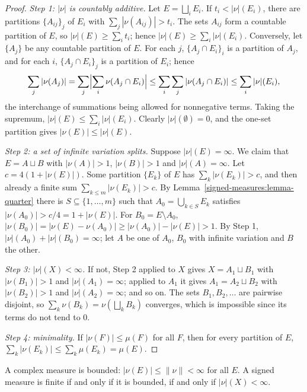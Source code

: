 \begin{proof}
\emph{Step 1: $|\nu|$ is countably additive.} Let $E = \bigsqcup_iE_i$. If $t_i < |\nu|(E_i)$, there are partitions $\{A_{ij}\}_j$ of $E_i$ with $\sum_j|\nu(A_{ij})| > t_i$. The sets $A_{ij}$ form a countable
partition of $E$, so $|\nu|(E) \geq \sum_it_i$; hence $|\nu|(E) \geq \sum_i|\nu|(E_i)$. Conversely, let $\{A_j\}$ be any countable partition of $E$. For each $j$, $\{A_j \cap E_i\}_i$ is a partition of
$A_j$, and for each $i$, $\{A_j \cap E_i\}_j$ is a partition of $E_i$; hence
\[
\sum_j|\nu(A_j)| = \sum_j\Bigl|\sum_i\nu(A_j \cap E_i)\Bigr| \leq \sum_i\sum_j|\nu(A_j \cap E_i)| \leq \sum_i|\nu|(E_i),
\]
the interchange of summations being allowed for nonnegative terms. Taking the supremum, $|\nu|(E) \leq \sum_i|\nu|(E_i)$. Clearly $|\nu|(\emptyset) = 0$, and the one-set partition gives
$|\nu(E)| \leq |\nu|(E)$.

\emph{Step 2: a set of infinite variation splits.} Suppose $|\nu|(E) = \infty$. We claim that $E = A \sqcup B$ with $|\nu(A)| > 1$, $|\nu(B)| > 1$ and $|\nu|(A) = \infty$. Let
$c = 4(1 + |\nu(E)|)$. Some partition $\{E_k\}$ of $E$ has $\sum_k|\nu(E_k)| > c$, and then already a finite sum $\sum_{k \leq m}|\nu(E_k)| > c$. By Lemma~\ref{signed-measures:lemma-quarter} there is
$S \subseteq \{1, \ldots, m\}$ such that $A_0 = \bigcup_{k \in S}E_k$ satisfies $|\nu(A_0)| > c/4 = 1 + |\nu(E)|$. For $B_0 = E \setminus A_0$,
$|\nu(B_0)| = |\nu(E) - \nu(A_0)| \geq |\nu(A_0)| - |\nu(E)| > 1$. By Step 1, $|\nu|(A_0) + |\nu|(B_0) = \infty$; let $A$ be one of $A_0$, $B_0$ with infinite variation and $B$ the other.

\emph{Step 3: $|\nu|(X) < \infty$.} If not, Step 2 applied to $X$ gives $X = A_1 \sqcup B_1$ with $|\nu(B_1)| > 1$ and $|\nu|(A_1) = \infty$; applied to $A_1$ it gives $A_1 = A_2 \sqcup B_2$ with
$|\nu(B_2)| > 1$ and $|\nu|(A_2) = \infty$; and so on. The sets $B_1, B_2, \ldots$ are pairwise disjoint, so $\sum_k\nu(B_k) = \nu(\bigsqcup_kB_k)$ converges, which is impossible since its terms
do not tend to $0$.

\emph{Step 4: minimality.} If $|\nu(F)| \leq \mu(F)$ for all $F$, then for every partition of $E$, $\sum_k|\nu(E_k)| \leq \sum_k\mu(E_k) = \mu(E)$.
\end{proof}

\begin{corollary}\label{signed-measures:corollary-bounded}
A complex measure is bounded: $|\nu(E)| \leq \|\nu\| < \infty$ for all $E$. A signed measure is finite if and only if it is bounded, if and only if $|\nu|(X) < \infty$.
\end{corollary}

